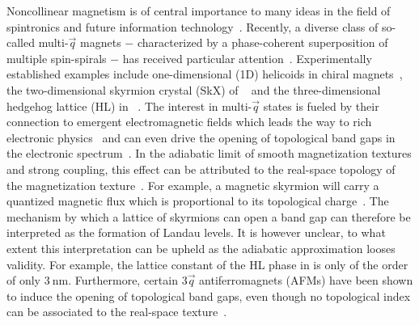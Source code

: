 \documentclass[
    10pt,
    aps,
    prl,
    twocolumn,
    floatfix,
    superscriptaddress
]{revtex4-2}
\begin{document}
Noncollinear magnetism is of central importance to many ideas in the field of spintronics and future information technology~\cite{Vedmedenko2020, Back2020}.
Recently, a diverse class of so-called multi-$\vec{q}$ magnets $-$ characterized by a phase-coherent superposition of multiple spin-spirals $-$ has received particular attention~\cite{Okubo2012, Takagi2018, Hirschberger2019, Fujishiro2019, Okumura2020}.
Experimentally established examples include one-dimensional (1D) helicoids in chiral magnets~\cite{Adams2012,Janoschek2013}, the two-dimensional skyrmion crystal (SkX) of ~\cite{Neubauer2009} and the three-dimensional hedgehog lattice (HL) in ~\cite{Tanigaki2015}.
The interest in multi-$\vec{q}$ states is fueled by their connection to emergent electromagnetic fields which leads the way to rich electronic physics~\cite{ Bliokh2005, Fujita2011}
and can even drive  the opening of topological band gaps in the electronic spectrum~\cite{Hamamoto2015, Goebel2017, Goebel2018}.
In the adiabatic limit of smooth magnetization textures and strong coupling, this effect can be attributed to the real-space topology of the magnetization texture~\cite{Bruno2004, EverschorSitte2014}.
For example, a magnetic skyrmion will carry a quantized magnetic flux which is proportional to its topological charge~\cite{Nagaosa2013}. 
The mechanism by which a lattice of skyrmions can open a band gap can therefore be interpreted as the formation of Landau levels.
It is however unclear, to what extent this interpretation can be upheld as the adiabatic approximation looses validity.
For example, the lattice constant of the HL phase in  is only of the order of only $\SI{3}{\nano\meter}$.
Furthermore, certain $3\vec{q}$ antiferromagnets (AFMs) have been shown to induce the opening of topological band gaps, even though no topological index can be associated to the real-space texture~\cite{Ndiaye2019, Feng2020}.
\end{document}
